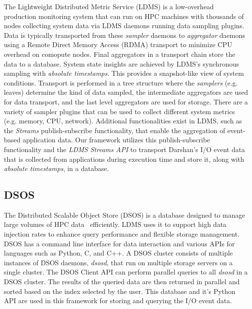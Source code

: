 The Lightweight Distributed Metric Service (LDMS) is a low-overhead production 
monitoring system that can run on HPC machines with thousands of nodes collecting 
system data via LDMS daemons running data sampling plugins.
Data is typically transported from these \emph{sampler} daemons to \emph{aggregator} 
daemons using a Remote Direct Memory Access (RDMA) transport to minimize CPU 
overhead on comopute nodes. Final aggregators in a transport chain store
the data to a database.
System state insights are achieved by LDMS's synchronous sampling with 
\emph{absolute timestamps}. This provides a snapshot-like view of system conditions.
Transport is performed in a tree structure where the \emph{samplers} (e.g. leaves) 
determine the kind of data sampled, the intermediate aggregators are used for data 
transport, and the last level aggregators are used for storage. There are a variety 
of sampler plugins that can be used to collect different system metrics 
(e.g. memory, CPU, network).
Additional functionalities exist in LDMS, such as the \emph{Streams} publish-subscribe
functionality, that enable the aggregation of event-based application data. Our framework 
utilizes this publish-subscribe functionality and the \emph{LDMS Streams API} to 
transport Darshan's I/O event data that is collected from applications during 
execution time and store it, along with \emph{absolute timestamps}, in a database.

\subsection{DSOS}
The Distributed Scalable Object Store (DSOS) is a database designed to manage large 
volumes of HPC data~\cite{sosgithub} efficiently. LDMS uses it to support high 
data injection rates to enhance query performance and flexible storage management. 
DSOS has a command line interface for data interaction and various APIs for 
languages such as Python, C, and C++. A DSOS cluster consists of multiple 
instances of DSOS daemons, \emph{dsosd}, that run on multiple storage servers 
on a single cluster. The DSOS Client API can perform parallel queries to all 
\emph{dsosd} in a DSOS cluster. The results of the queried data are then returned 
in parallel and sorted based on the index selected by the user. This database and 
it's Python API are used in this framework for storing and querying the I/O event data. 
